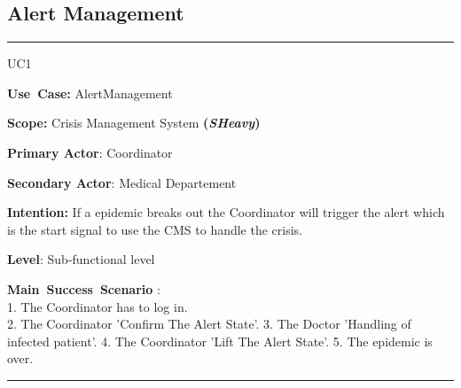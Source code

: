 \subsection{Alert Management}
\vspace{0.5cm}
\hrule
\vspace{0.5cm}
\begin{lyxlist}{UC1}
\small{
\item [\textbf{Use~Case:}] AlertManagement
\item [\textbf{Scope:}] Crisis Management System \textbf{(\emph{SHeavy})}
\item [\textbf{Primary Actor}:] Coordinator
\item [\textbf{Secondary Actor}:] Medical Departement
\item [\textbf{Intention:}] If a epidemic breaks out the Coordinator will
trigger the alert which is the start signal to use the CMS to handle the crisis.
\item [\textbf{Level}:]Sub-functional level
\item [\textbf{Main~Success~Scenario}]:\\
1. The Coordinator has to log in.\\
2. The Coordinator 'Confirm The Alert State'.
3. The Doctor 'Handling of infected patient'.
4. The Coordinator 'Lift The Alert State'.
5. The epidemic is over.\\
}
\end{lyxlist}
\hrule 
\vspace{0.5cm} 

